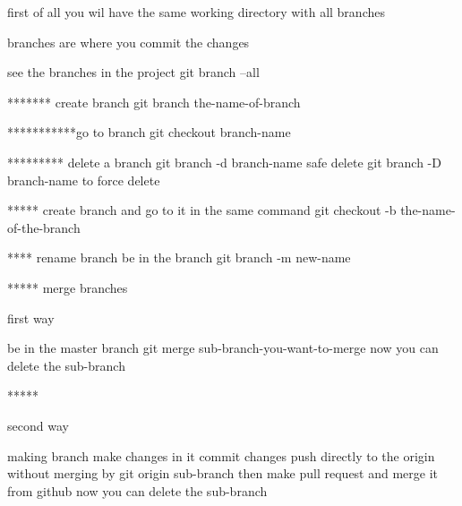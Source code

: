 first of all you wil have the same working directory with all branches 

branches are where you commit the changes 


see the branches in the project  
git branch --all 

******* create branch 
git branch the-name-of-branch

***********go to branch 
git checkout branch-name


********* delete a branch 
git branch -d branch-name     safe delete 
git branch -D branch-name  to force delete 

***** create branch and go to it in the same command 
git checkout -b the-name-of-the-branch

**** rename branch 
be in the branch
git branch -m new-name 

***** merge branches 

first way 

be in the master branch 
git merge sub-branch-you-want-to-merge
now you can delete the sub-branch 

***** 

second way 

making branch 
make changes in it 
commit changes 
push directly to the origin without merging by 
  git  origin sub-branch 
then make pull request
  and merge it from github 
now you can delete the sub-branch 
